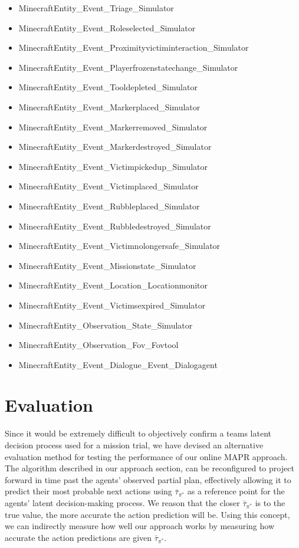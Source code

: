 \begin{itemize}
\item MinecraftEntity\_Event\_Triage\_Simulator
\item MinecraftEntity\_Event\_Roleselected\_Simulator
\item MinecraftEntity\_Event\_Proximityvictiminteraction\_Simulator
\item MinecraftEntity\_Event\_Playerfrozenstatechange\_Simulator
\item MinecraftEntity\_Event\_Tooldepleted\_Simulator
\item MinecraftEntity\_Event\_Markerplaced\_Simulator
\item MinecraftEntity\_Event\_Markerremoved\_Simulator
\item MinecraftEntity\_Event\_Markerdestroyed\_Simulator
\item MinecraftEntity\_Event\_Victimpickedup\_Simulator
\item MinecraftEntity\_Event\_Victimplaced\_Simulator
\item MinecraftEntity\_Event\_Rubbleplaced\_Simulator
\item MinecraftEntity\_Event\_Rubbledestroyed\_Simulator
\item MinecraftEntity\_Event\_Victimnolongersafe\_Simulator
\item MinecraftEntity\_Event\_Missionstate\_Simulator
\item MinecraftEntity\_Event\_Location\_Locationmonitor
\item MinecraftEntity\_Event\_Victimsexpired\_Simulator
\item MinecraftEntity\_Observation\_State\_Simulator
\item MinecraftEntity\_Observation\_Fov\_Fovtool
\item MinecraftEntity\_Event\_Dialogue\_Event\_Dialogagent
\end{itemize}

\section{Evaluation}
Since it would be extremely difficult to objectively confirm a teams latent decision process used for a mission trial, we have devised an alternative evaluation method for testing the performance of our online MAPR approach. The algorithm described in our approach section, can be reconfigured to project forward in time past the agents' observed partial plan, effectively allowing it to predict their most probable next actions using $\bar{\tau}_{\pi^*}$ as a reference point for the agents' latent decision-making process. We reason that the closer $\bar{\tau}_{\pi^*}$ is to the true value, the more accurate the action prediction will be. Using this concept, we can indirectly measure how well our approach works by measuring how accurate the action predictions are given $\bar{\tau}_{\pi^*}$.

